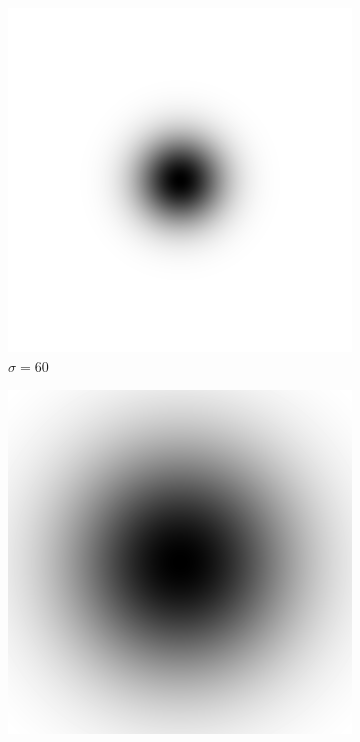 \documentclass[
	12pt, %
]{style/fphw}
\begin{document}
\begin{figure}[H]
\begin{subfigure}[b]{.3\textwidth}
         \includegraphics[width=\textwidth]{Q5_2_highpass_filter_60.png}
         \caption{$\sigma=60$}
         \label{Q5_2_high_filter_60}
     \end{subfigure}
     \hfill
     \begin{subfigure}[b]{.3\textwidth}
         \centering
         \includegraphics[width=\textwidth]{Q5_2_highpass_filter_160.png}

\end{subfigure}
\end{figure}
\end{document}
